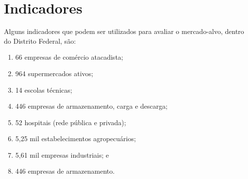 \section{Indicadores}

Alguns indicadores que podem ser utilizados para avaliar o mercado-alvo, dentro
do Distrito Federal, são:

%
%
\begin{enumerate}
  \item 66 empresas de comércio atacadista;
  \item 964 supermercados ativos;
  \item 14 escolas técnicas;
  \item 446 empresas de armazenamento, carga e descarga;
  \item 52 hospitais (rede pública e privada);
  \item 5,25 mil estabelecimentos agropecuários;
  \item 5,61 mil empresas industriais; e
  \item 446 empresas de armazenamento.
\end{enumerate}
